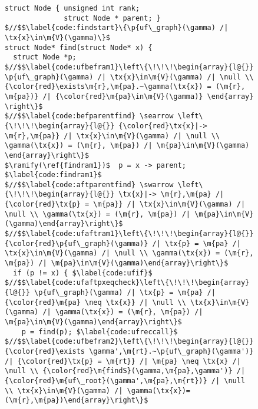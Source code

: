 \begin{figure}[t]
\vspace{-1ex}
  \begin{lstlisting}[multicols=2]
struct Node { unsigned int rank; 
              struct Node * parent; }
$//$$\label{code:findstart}\{\p{uf\_graph}(\gamma) /| \tx{x}\in\m{V}(\gamma)\}$
struct Node* find(struct Node* x) {
  struct Node *p;
$//$$\label{code:ufbefram1}\left\{\!\!\!\begin{array}{l@{}} \p{uf\_graph}(\gamma) /| \tx{x}\in\m{V}(\gamma) /| \null \\ {\color{red}\exists\m{r},\m{pa}.~\gamma(\tx{x}) = (\m{r}, \m{pa})} /| {\color{red}\m{pa}\in\m{V}(\gamma)} \end{array} \right\}$
$//$$\label{code:befparentfind} \searrow \left\{\!\!\!\begin{array}{l@{}} {\color{red}\tx{x}|-> \m{r},\m{pa}} /| \tx{x}\in\m{V}(\gamma) /| \null \\ \gamma(\tx{x}) = (\m{r}, \m{pa}) /| \m{pa}\in\m{V}(\gamma) \end{array}\right\}$
$\ramify(\ref{findram1})$  p = x -> parent; $\label{code:findram1}$
$//$$\label{code:aftparentfind} \swarrow \left\{\!\!\!\begin{array}{l@{}} \tx{x}|-> \m{r},\m{pa} /| {\color{red}\tx{p} = \m{pa}} /| \tx{x}\in\m{V}(\gamma) /| \null \\ \gamma(\tx{x}) = (\m{r}, \m{pa}) /| \m{pa}\in\m{V}(\gamma)\end{array}\right\}$
$//$$\label{code:ufaftram1}\left\{\!\!\!\begin{array}{l@{}} {\color{red}\p{uf\_graph}(\gamma)} /| \tx{p} = \m{pa} /| \tx{x}\in\m{V}(\gamma) /| \null \\ \gamma(\tx{x}) = (\m{r}, \m{pa}) /| \m{pa}\in\m{V}(\gamma)\end{array}\right\}$
  if (p != x) { $\label{code:ufif}$
$//$$\label{code:ufaftpxeqcheck}\left\{\!\!\!\begin{array}{l@{}} \p{uf\_graph}(\gamma) /| \tx{p} = \m{pa} /| {\color{red}\m{pa} \neq \tx{x}} /| \null \\ \tx{x}\in\m{V}(\gamma) /| \gamma(\tx{x}) = (\m{r}, \m{pa}) /| \m{pa}\in\m{V}(\gamma)\end{array}\right\}$
    p = find(p); $\label{code:ufreccall}$
$//$$\label{code:ufbefram2}\left\{\!\!\!\begin{array}{l@{}}{\color{red}\exists \gamma',\m{rt}.~\p{uf\_graph}(\gamma')} /| {\color{red}\tx{p} = \m{rt}} /| \m{pa} \neq \tx{x} /| \null \\ {\color{red}\m{findS}(\gamma,\m{pa},\gamma')} /| {\color{red}\m{uf\_root}(\gamma',\m{pa},\m{rt})} /| \null \\ \tx{x}\in\m{V}(\gamma) /| \gamma(\tx{x})=(\m{r},\m{pa})\end{array}\right\}$

\end{lstlisting}
\end{figure}
